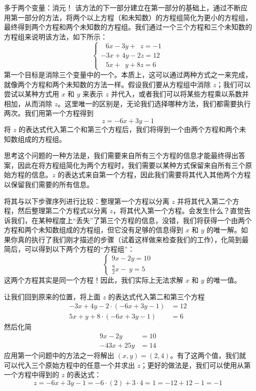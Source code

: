 \begin{method}{多于两个变量：消元！}
    该方法的下一部分建立在第一部分的基础上，通过不断应用第一部分的方法，将两个以上方程（和未知数）的方程组简化为更小的方程组，最终得到两个方程和两个未知数的方程组。我们通过一个三个方程和三个未知数的方程组来说明该方法，如下所示：
    $$
    \begin{cases}
        \enspace\: 6x - 3y + \enspace z = -1 \\
        -3x + 4y - 2z = 12 \\
        \enspace\: 5x + \enspace y + 8z = 6
    \end{cases}
    $$
    第一个目标是消除三个变量中的一个。本质上，这可以通过两种方式之一来完成，就像两个方程和两个未知数的方法一样。假设我们要从方程组中消除 $z$；我们可以尝试以某种方式用 $x$ 和 $y$ 来表示 $z$ 并代入，或者我们可以将某些方程乘以系数并相加，从而消除 $z$。这里唯一的区别是，无论我们选择哪种方法，我们都需要执行两次。我们用第一个方程得到
    \[z = -6x + 3y - 1\]
    将 $z$ 的表达式代入第二个和第三个方程后，我们将得到一个由两个方程和两个未知数组成的方程组。

    思考这个问题的一种方法是，我们需要来自所有三个方程的信息才能最终得出答案，因此在将方程组简化为两个方程时，我们需要以某种方式保留来自所有三个原始方程的信息。$z$ 的表达式来自第一个方程，因此我们需要将其代入其他两个方程以保留我们需要的所有信息。

    将其与以下步骤序列进行比较：整理第一个方程以分离 $z$ 并将其代入第二个方程，然后整理第二个方程式以分离 $z$，将其代入第一个方程。会发生什么？直觉告诉我们，在某种程度上“丢失”了第三个方程的信息，没错，我们将获得一个由两个方程和两个未知数组成的方程组，但它没有足够的信息得到 $x$ 和 $y$ 的唯一解。如果你真的执行了我们刚才描述的步骤（试着这样做来检查我们的工作），化简到最简后，可以得到以下两个方程的“方程组”：
    $$
    \begin{cases}
        9x - 2y = 10 \\
        \frac{9}{2}x - \:y = 5
    \end{cases}
    $$
    这两个方程其实是同一个方程！因此，我们实际上无法求解 $x$ 和 $y$ 的唯一值。

    让我们回到原来的位置，将上面 $z$ 的表达式代入第二和第三个方程
    \begin{align*}
        -3x + 4y - 2 \cdot (-6x + 3y - 1) &= 12 \\
        5x + y + 8 \cdot (-6x + 3y - 1) &= 6
    \end{align*}
    然后化简
    \begin{align*}
        9x - 2y &= 10 \\
        -43x + 25y &= 14
    \end{align*}
    应用第一个问题中的方法之一将解出 $(x, y) = (2, 4)$。有了这两个值，我们就可以代入三个原始方程中的任意一个并求出 $z$；更好的做法是，我们可以使用从第一个方程中得到的 $z$ 的表达式：
    \[z = -6x + 3y - 1 = -6 \cdot (2) + 3 \cdot 4 = 1 = -12 + 12 - 1 = -1\]
\end{method}

